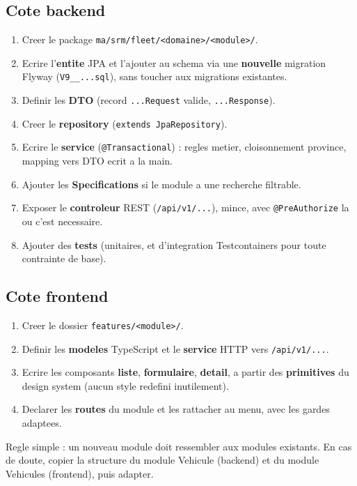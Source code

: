 \documentclass[11pt]{article}
\begin{document}
\subsection{Cote backend}
\begin{enumerate}
  \item Creer le package \texttt{ma/srm/fleet/<domaine>/<module>/}.
  \item Ecrire l'\textbf{entite} JPA et l'ajouter au schema via une \textbf{nouvelle} migration Flyway
        (\texttt{V9\_\_...sql}), sans toucher aux migrations existantes.
  \item Definir les \textbf{DTO} (record \texttt{...Request} valide, \texttt{...Response}).
  \item Creer le \textbf{repository} (\texttt{extends JpaRepository}).
  \item Ecrire le \textbf{service} (\texttt{@Transactional}) : regles metier, cloisonnement province,
        mapping vers DTO ecrit a la main.
  \item Ajouter les \textbf{Specifications} si le module a une recherche filtrable.
  \item Exposer le \textbf{controleur} REST (\texttt{/api/v1/...}), mince, avec \texttt{@PreAuthorize} la
        ou c'est necessaire.
  \item Ajouter des \textbf{tests} (unitaires, et d'integration Testcontainers pour toute contrainte de base).
\end{enumerate}

\subsection{Cote frontend}
\begin{enumerate}
  \item Creer le dossier \texttt{features/<module>/}.
  \item Definir les \textbf{modeles} TypeScript et le \textbf{service} HTTP vers \texttt{/api/v1/...}.
  \item Ecrire les composants \textbf{liste}, \textbf{formulaire}, \textbf{detail}, a partir des
        \textbf{primitives} du design system (aucun style redefini inutilement).
  \item Declarer les \textbf{routes} du module et les rattacher au menu, avec les gardes adaptees.
\end{enumerate}

\begin{srmok}
Regle simple : un nouveau module doit ressembler aux modules existants. En cas de doute, copier la
structure du module Vehicule (backend) et du module Vehicules (frontend), puis adapter.
\end{srmok}
\end{document}

